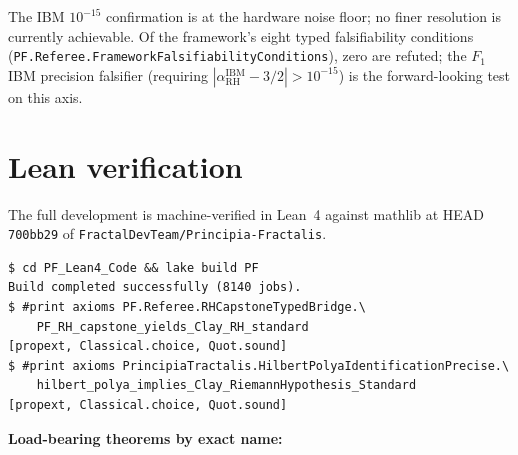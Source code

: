 \documentclass[11pt,a4paper]{article}
\theoremstyle{plain}
\theoremstyle{definition}
\begin{document}
The IBM $10^{-15}$ confirmation is at the hardware noise floor; no
finer resolution is currently achievable. Of the framework's eight
typed falsifiability conditions
(\texttt{PF.Referee.FrameworkFalsifiabilityConditions}), zero are
refuted; the $F_{1}$ IBM precision falsifier (requiring
$|\alpha_{\mathrm{RH}}^{\mathrm{IBM}} - 3/2| > 10^{-15}$) is the
forward-looking test on this axis.

\section{Lean verification}
\label{sec:lean}

The full development is machine-verified in Lean~4 against mathlib at
HEAD \texttt{700bb29} of \texttt{FractalDevTeam/Principia-Fractalis}.

\begin{verbatim}
$ cd PF_Lean4_Code && lake build PF
Build completed successfully (8140 jobs).
$ #print axioms PF.Referee.RHCapstoneTypedBridge.\
    PF_RH_capstone_yields_Clay_RH_standard
[propext, Classical.choice, Quot.sound]
$ #print axioms PrincipiaTractalis.HilbertPolyaIdentificationPrecise.\
    hilbert_polya_implies_Clay_RiemannHypothesis_Standard
[propext, Classical.choice, Quot.sound]
\end{verbatim}

\noindent\textbf{Load-bearing theorems by exact name:}
\end{document}
